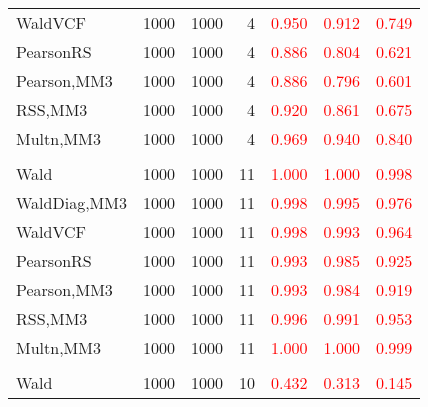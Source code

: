 \documentclass[
]{article}
\begin{document}
\begin{table}[H]
{\begin{tabular}[t]{lrrrrrr}
\hspace{1em}WaldVCF & 1000 & 1000 & 4 & \textcolor{red}{0.950} & \textcolor{red}{0.912} & \textcolor{red}{0.749}\\
\hspace{1em}PearsonRS & 1000 & 1000 & 4 & \textcolor{red}{0.886} & \textcolor{red}{0.804} & \textcolor{red}{0.621}\\
\hspace{1em}Pearson,MM3 & 1000 & 1000 & 4 & \textcolor{red}{0.886} & \textcolor{red}{0.796} & \textcolor{red}{0.601}\\
\hspace{1em}RSS,MM3 & 1000 & 1000 & 4 & \textcolor{red}{0.920} & \textcolor{red}{0.861} & \textcolor{red}{0.675}\\
\hspace{1em}Multn,MM3 & 1000 & 1000 & 4 & \textcolor{red}{0.969} & \textcolor{red}{0.940} & \textcolor{red}{0.840}\\
\addlinespace[0.3em]
\multicolumn{7}{l}{\textbf{1F 15V}}\\
\hspace{1em}Wald & 1000 & 1000 & 11 & \textcolor{red}{1.000} & \textcolor{red}{1.000} & \textcolor{red}{0.998}\\
\hspace{1em}WaldDiag,MM3 & 1000 & 1000 & 11 & \textcolor{red}{0.998} & \textcolor{red}{0.995} & \textcolor{red}{0.976}\\
\hspace{1em}WaldVCF & 1000 & 1000 & 11 & \textcolor{red}{0.998} & \textcolor{red}{0.993} & \textcolor{red}{0.964}\\
\hspace{1em}PearsonRS & 1000 & 1000 & 11 & \textcolor{red}{0.993} & \textcolor{red}{0.985} & \textcolor{red}{0.925}\\
\hspace{1em}Pearson,MM3 & 1000 & 1000 & 11 & \textcolor{red}{0.993} & \textcolor{red}{0.984} & \textcolor{red}{0.919}\\
\hspace{1em}RSS,MM3 & 1000 & 1000 & 11 & \textcolor{red}{0.996} & \textcolor{red}{0.991} & \textcolor{red}{0.953}\\
\hspace{1em}Multn,MM3 & 1000 & 1000 & 11 & \textcolor{red}{1.000} & \textcolor{red}{1.000} & \textcolor{red}{0.999}\\
\addlinespace[0.3em]
\multicolumn{7}{l}{\textbf{2F 10V}}\\
\hspace{1em}Wald & 1000 & 1000 & 10 & \textcolor{red}{0.432} & \textcolor{red}{0.313} & \textcolor{red}{0.145}\\

\end{tabular}}
\end{table}
\end{document}
